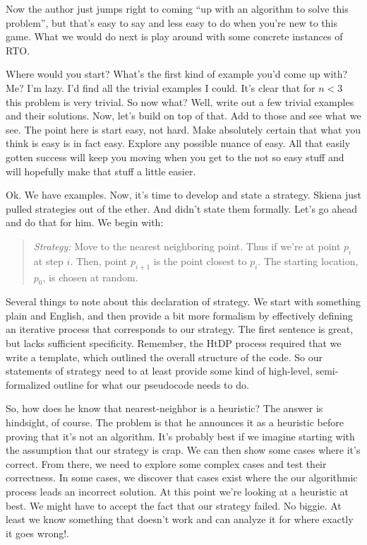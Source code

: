 \documentclass[]{tufte-handout}
\begin{document}
Now the author just jumps right to coming ``up with an algorithm to solve this problem'', but that's easy to say and less easy to do when you're new to this game.  What we would do next is play around with some concrete instances of \textsc{RTO}.  

Where would you start? What's the first kind of example you'd come up with? Me? I'm lazy. I'd find all the trivial examples I could.  It's clear that for $n<3$ this problem is very trivial. So now what? Well, write out a few trivial examples and their solutions. Now, let's build on top of that. Add to those and see what we see. The point here is start easy, not hard. Make absolutely certain that what you think is easy is in fact easy. Explore any possible nuance of easy. All that easily gotten success will keep you moving when you get to the not so easy stuff and will hopefully make that stuff a little easier.  

Ok. We have examples. Now, it's time to develop and state a strategy.  Skiena just pulled strategies out of the ether. And didn't state them formally. Let's go ahead and do that for him. We begin with:
\begin{quote}
\textit{Strategy:} Move to the nearest neighboring point. Thus if we're at point $p_i$ at step $i$. Then, point $p_{i+1}$ is the point closest to $p_i$. The starting location, $p_0$, is chosen at random. 
\end{quote}
Several things to note about this declaration of strategy. We start with something plain and English, and then provide a bit more formalism by effectively defining an iterative process that corresponds to our strategy.  The first sentence is great, but lacks sufficient specificity. Remember, the HtDP process required that we write a template, which outlined the overall structure of the code. So our statements of strategy need to at least provide some kind of high-level, semi-formalized outline for what our pseudocode needs to do.

So, how does he know that nearest-neighbor is a heuristic? The answer is hindsight, of course. The problem is that he announces it as a heuristic before proving that it's not an algorithm.  It's probably best if we imagine starting with the assumption that our strategy is crap. We can then show some cases where it's correct. From there, we need to explore some complex cases and test their correctness. In some cases, we discover that cases exist where the our algorithmic process leads an incorrect solution. At this point we're looking at a heuristic at best.  We might have to accept the fact that our strategy failed. No biggie. At least we know something that doesn't work and can analyze it for where exactly it goes wrong!. 
\end{document}
